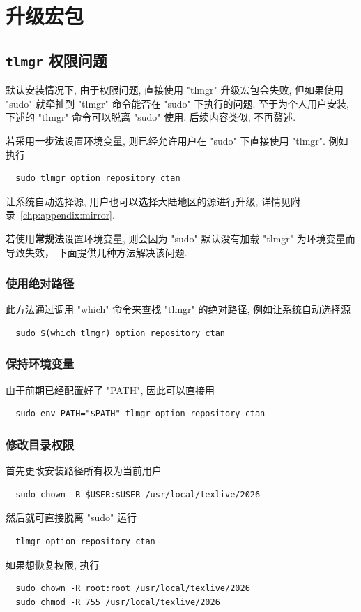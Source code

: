 \section{升级宏包}\label{sec:ubuntu:update}

\subsection{\texttt{tlmgr} 权限问题}\label{sec:ubuntu:tlmgr}

默认安装情况下,
由于权限问题,
直接使用 "tlmgr" 升级宏包会失败,
但如果使用 "sudo" 就牵扯到 "tlmgr" 命令能否在 "sudo" 下执行的问题.
至于为个人用户安装,
下述的 "tlmgr" 命令可以脱离 "sudo" 使用.
后续内容类似,
不再赘述.

若采用\textbf{一步法}设置环境变量,
则已经允许用户在 "sudo" 下直接使用 "tlmgr".
例如执行
\begin{lstlisting}
  sudo tlmgr option repository ctan
\end{lstlisting}
让系统自动选择源,
用户也可以选择大陆地区的源进行升级,
详情见附录~\ref{chp:appendix:mirror}.

若使用\textbf{常规法}设置环境变量,
则会因为 "sudo" 默认没有加载 "tlmgr" 为环境变量而导致失效，
下面提供几种方法解决该问题.

\subsubsection{使用绝对路径}

此方法通过调用 "which" 命令来查找 "tlmgr" 的绝对路径,
例如让系统自动选择源
\begin{lstlisting}
  sudo $(which tlmgr) option repository ctan
\end{lstlisting}

\subsubsection{保持环境变量}

由于前期已经配置好了 "PATH",
因此可以直接用
\begin{lstlisting}
  sudo env PATH="$PATH" tlmgr option repository ctan
\end{lstlisting}

\subsubsection{修改目录权限}

首先更改安装路径所有权为当前用户
\begin{lstlisting}
  sudo chown -R $USER:$USER /usr/local/texlive/2026
\end{lstlisting}
然后就可直接脱离 "sudo" 运行
\begin{lstlisting}
  tlmgr option repository ctan
\end{lstlisting}
如果想恢复权限,
执行
\begin{lstlisting}
  sudo chown -R root:root /usr/local/texlive/2026
  sudo chmod -R 755 /usr/local/texlive/2026
\end{lstlisting}

